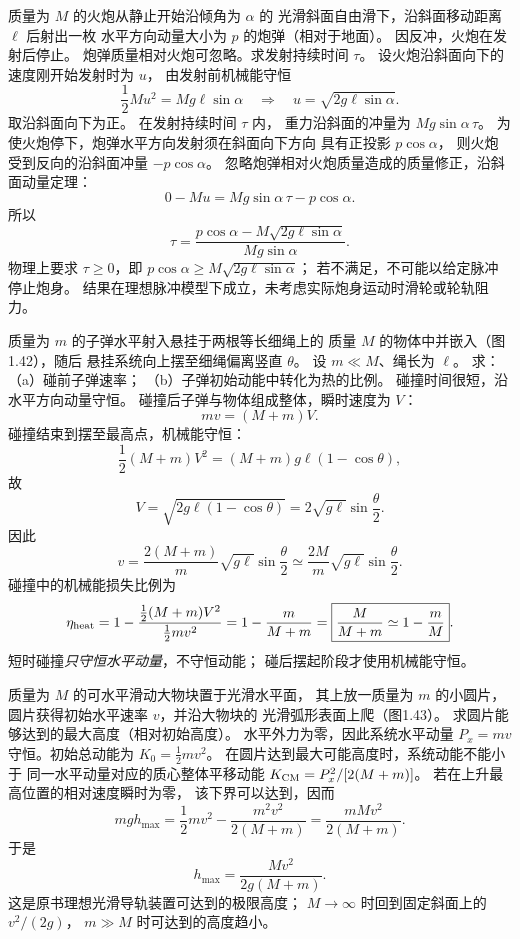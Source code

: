 质量为 $M$ 的火炮从静止开始沿倾角为 $\alpha$ 的
光滑斜面自由滑下，沿斜面移动距离 $\ell$ 后射出一枚
水平方向动量大小为 $p$ 的炮弹（相对于地面）。
因反冲，火炮在发射后停止。
炮弹质量相对火炮可忽略。求发射持续时间 $\tau$。
\exsolution
设火炮沿斜面向下的速度刚开始发射时为 $u$，
由发射前机械能守恒
\[
\frac12Mu^2=Mg\ell\sin\alpha
\quad\Longrightarrow\quad
u=\sqrt{2g\ell\sin\alpha}.
\]
取沿斜面向下为正。
在发射持续时间 $\tau$ 内，
重力沿斜面的冲量为 $Mg\sin\alpha\,\tau$。
为使火炮停下，炮弹水平方向发射须在斜面向下方向
具有正投影 $p\cos\alpha$，
则火炮受到反向的沿斜面冲量 $-p\cos\alpha$。
忽略炮弹相对火炮质量造成的质量修正，沿斜面动量定理：
\[
0-Mu=Mg\sin\alpha\,\tau-p\cos\alpha .
\]
所以
\[
\boxed{\tau=
\frac{p\cos\alpha-M\sqrt{2g\ell\sin\alpha}}
 {Mg\sin\alpha}}.
\]
\excheck 物理上要求 $\tau\ge0$，即
$p\cos\alpha\ge M\sqrt{2g\ell\sin\alpha}$；
若不满足，不可能以给定脉冲停止炮身。
结果在理想脉冲模型下成立，未考虑实际炮身运动时滑轮或轮轨阻力。

质量为 $m$ 的子弹水平射入悬挂于两根等长细绳上的
质量 $M$ 的物体中并嵌入（图1.42），随后
悬挂系统向上摆至细绳偏离竖直 $\theta$。
设 $m\ll M$、绳长为 $\ell$。
求：（a）碰前子弹速率；
（b）子弹初始动能中转化为热的比例。
\exsolution
碰撞时间很短，沿水平方向动量守恒。
碰撞后子弹与物体组成整体，瞬时速度为 $V$：
\[
mv=(M+m)V.
\]
碰撞结束到摆至最高点，机械能守恒：
\[
\frac12(M+m)V^2=(M+m)g\ell(1-\cos\theta),
\]
故
\[
V=\sqrt{2g\ell(1-\cos\theta)}
=2\sqrt{g\ell}\sin\frac\theta2.
\]
因此
\[
\boxed{v=\frac{2(M+m)}m\sqrt{g\ell}
\sin\frac\theta2
\simeq\frac{2M}{m}\sqrt{g\ell}\sin\frac\theta2}.
\]
碰撞中的机械能损失比例为
\[
\eta_{\rm heat}=
1-\frac{\tfrac12(M+m)V^2}{\tfrac12mv^2}
=1-\frac{m}{M+m}
=\boxed{\frac{M}{M+m}\simeq1-\frac mM}.
\]
\excheck 短时碰撞\emph{只守恒水平动量}，不守恒动能；
碰后摆起阶段才使用机械能守恒。

质量为 $M$ 的可水平滑动大物块置于光滑水平面，
其上放一质量为 $m$ 的小圆片，
圆片获得初始水平速率 $v$，并沿大物块的
光滑弧形表面上爬（图1.43）。
求圆片能够达到的最大高度（相对初始高度）。
\exsolution
水平外力为零，因此系统水平动量
$P_x=mv$ 守恒。初始总动能为
$K_0=\tfrac12mv^2$。
在圆片达到最大可能高度时，系统动能不能小于
同一水平动量对应的质心整体平移动能
$K_{\rm CM}=P_x^2/[2(M+m)]$。
若在上升最高位置的相对速度瞬时为零，
该下界可以达到，因而
\[
mgh_{\max}=
\frac12mv^2-\frac{m^2v^2}{2(M+m)}
=\frac{mMv^2}{2(M+m)}.
\]
于是
\[
\boxed{h_{\max}=\frac{Mv^2}{2g(M+m)}}.
\]
\excheck 这是原书理想光滑导轨装置可达到的极限高度；
$M\to\infty$ 时回到固定斜面上的 $v^2/(2g)$，
$m\gg M$ 时可达到的高度趋小。

